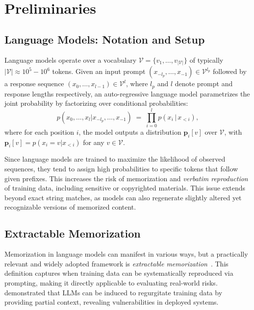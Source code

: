 \section{Preliminaries}
\label{section:preliminaries}
\subsection{Language Models: Notation and Setup}

Language models operate over a vocabulary \(\mathcal{V} = \{v_1, \ldots, v_{|\mathcal{V}|}\}\) of typically \(|\mathcal{V}| \approx 10^5-10^6\) tokens. Given an input prompt \((x_{-l_p}, \ldots, x_{-1}) \in \mathcal{V}^{l_p}\) followed by a response sequence \((x_0, \ldots, x_{l-1}) \in \mathcal{V}^{l}\), where \(l_p\) and \(l\) denote prompt and response lengths respectively, an auto-regressive language model parametrizes the joint probability by factorizing over conditional probabilities:
%
\begin{equation}
    p(x_0, \ldots, x_l | x_{-l_p}, \ldots, x_{-1}) \;=\; \prod_{i=0}^l p(x_i \,|\, x_{<i}),
\label{eq:autoregressive}
\end{equation}
%
where for each position \(i\), the model outputs a distribution \(\mathbf{p}_i[v]\) over \(\mathcal{V}\), with \(\mathbf{p}_i[v] = p(x_i = v | x_{<i})\) for any \(v \in \mathcal{V}\).

Since language models are trained to maximize the likelihood of observed sequences, they tend to assign high probabilities to specific tokens that follow given prefixes. This increases the risk of memorization and \emph{verbatim reproduction} of training data, including sensitive or copyrighted materials. This issue extends beyond exact string matches, as models can also regenerate slightly altered yet recognizable versions of memorized content. 


\subsection{Extractable Memorization}
Memorization in language models can manifest in various ways, but a practically relevant and widely adopted framework is \emph{extractable memorization}~\citep{carlini2021extracting, carlini2022quantifying}. This definition captures when training data can be systematically reproduced via prompting, making it directly applicable to evaluating real-world risks. \citet{carlini2021extracting} demonstrated that LLMs can be induced to regurgitate training data by providing partial context, revealing vulnerabilities in deployed systems. 

